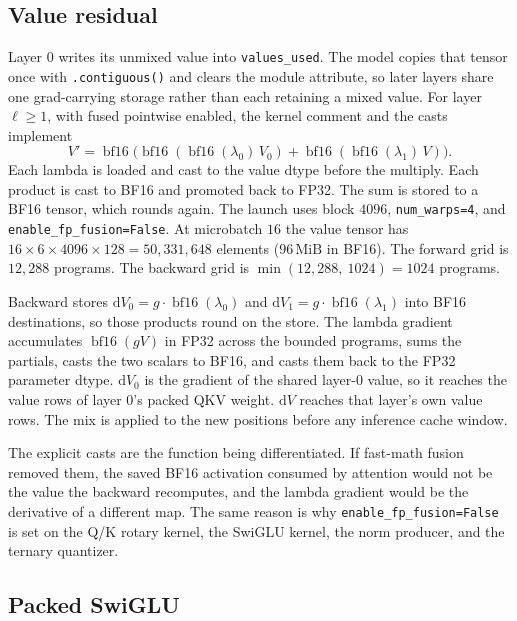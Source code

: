 \documentclass[11pt]{article}
\DeclareRobustCommand{\code}[1]{\texttt{#1}}
\newcommand{\bfsixteen}{\operatorname{bf16}}
\newcommand{\MiB}{\,\mathrm{MiB}}
\begin{document}
\subsection{Value residual}
\label{sec:value}

Layer \(0\) writes its unmixed value into \code{values\_used}. The model
copies that tensor once with \code{.contiguous()} and clears the module
attribute, so later layers share one grad-carrying storage rather than each
retaining a mixed value. For layer \(\ell\ge 1\), with fused pointwise
enabled, the kernel comment and the casts implement
\begin{equation}
\label{eq:vmix}
V'
 =
 \bfsixteen\!\big(
   \bfsixteen(\bfsixteen(\lambda_0)\,V_0)
   +
   \bfsixteen(\bfsixteen(\lambda_1)\,V)
 \big).
\end{equation}
Each lambda is loaded and cast to the value dtype before the multiply. Each
product is cast to BF16 and promoted back to FP32. The sum is stored to a
BF16 tensor, which rounds again. The launch uses block \(4096\),
\code{num\_warps=4}, and \code{enable\_fp\_fusion=False}. At microbatch
\(16\) the value tensor has
\(16\times 6\times 4096\times 128=50{,}331{,}648\) elements
(\(96\MiB\) in BF16). The forward grid is \(12{,}288\) programs. The
backward grid is \(\min(12{,}288,\ 1024)=1024\) programs.

Backward stores \(\mathrm{d}V_0=g\cdot\bfsixteen(\lambda_0)\) and
\(\mathrm{d}V_1=g\cdot\bfsixteen(\lambda_1)\) into BF16 destinations, so
those products round on the store. The lambda gradient accumulates
\(\bfsixteen(g V)\) in FP32 across the bounded programs, sums the partials,
casts the two scalars to BF16, and casts them back to the FP32 parameter
dtype. \(\mathrm{d}V_0\) is the gradient of the shared layer-\(0\) value, so
it reaches the value rows of layer \(0\)'s packed QKV weight. \(\mathrm{d}V\)
reaches that layer's own value rows. The mix is applied to the new positions
before any inference cache window.

The explicit casts are the function being differentiated. If fast-math
fusion removed them, the saved BF16 activation consumed by attention would
not be the value the backward recomputes, and the lambda gradient would be
the derivative of a different map. The same reason is why
\code{enable\_fp\_fusion=False} is set on the Q/K rotary kernel, the SwiGLU
kernel, the norm producer, and the ternary quantizer.

\subsection{Packed SwiGLU}
\end{document}
